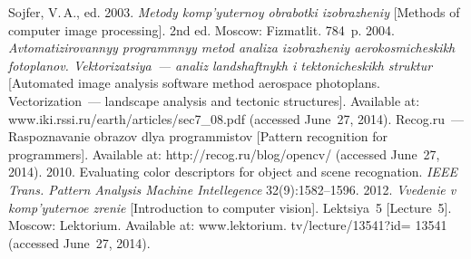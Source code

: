 


  \begin{multicols}{2}

\renewcommand{\bibname}{\protect\rmfamily References}

{\small\frenchspacing
 {%
 \begin{thebibliography}{9}

  Sojfer, V.\,A., ed. 2003.
  \textit{Metody komp'yuternoy obrabotki izobrazheniy} [Methods of computer
image processing]. 2nd ed. Moscow: Fizmatlit. 784~p.
   2004. \textit{Avtomatizirovannyy pro\-gram\-mnyy metod
analiza izobrazheniy aerokosmicheskikh fotopla\-nov. Vektorizatsiya~--- analiz
landshaftnykh i tektoni\-cheskikh struktur} [Automated image analysis \mbox{software}
method aerospace photoplans. Vectorization~--- landscape analysis and tectonic
structures]. Available at: {\sf www.iki.rssi.ru/earth/articles/sec7\_08.pdf} (accessed
June~27, 2014).
  Recog.ru~--- Raspoznavanie obrazov dlya pro\-gram\-mi\-stov [Pattern recognition for
programmers]. Available at: {\sf http://recog.ru/blog/opencv/} (accessed June~27, 2014).
   2010.
Evaluating color descriptors for object and scene recognation. \textit{IEEE Trans.
Pattern Analysis Machine Intellegence} 32(9):1582--1596.
   2012. \textit{Vvedenie v komp'yuternoe zrenie}
[Introduction to computer vision]. Lektsiya~5 [Lecture~5]. Moscow: Lektorium.
Available at: {\sf www.lektorium. tv/lecture/13541?id= 13541} (accessed
June~27, 2014).

\end{thebibliography}

 }
 }

\end{multicols}

